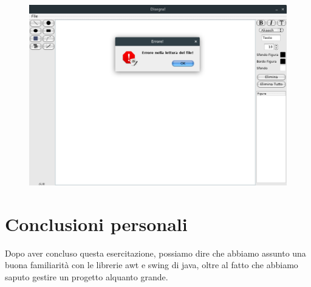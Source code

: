 \documentclass[a4paper,12pt]{article}
\begin{document}
\begin{figure}
\includegraphics[scale=.4]{Immagini/Debug/test5.png}
\end{figure}
\clearpage
\section{Conclusioni personali}
Dopo aver concluso questa esercitazione, possiamo dire che abbiamo assunto una buona familiarità con le librerie awt e swing di java, oltre al fatto che abbiamo saputo gestire un progetto alquanto grande.
\printbibliography
\end{document}
